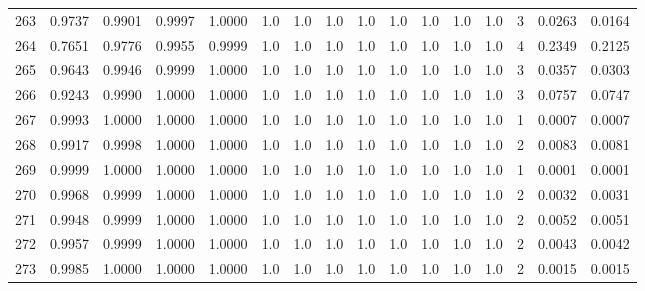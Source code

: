 \begin{tabular}{lrrrrrrrrrrrrrrr}
263 &      0.9737 &  0.9901 &  0.9997 &  1.0000 &     1.0 &     1.0 &     1.0 &     1.0 &     1.0 &     1.0 &      1.0 &        1.0 &      3 &                    0.0263 &                     0.0164 \\
264 &      0.7651 &  0.9776 &  0.9955 &  0.9999 &     1.0 &     1.0 &     1.0 &     1.0 &     1.0 &     1.0 &      1.0 &        1.0 &      4 &                    0.2349 &                     0.2125 \\
265 &      0.9643 &  0.9946 &  0.9999 &  1.0000 &     1.0 &     1.0 &     1.0 &     1.0 &     1.0 &     1.0 &      1.0 &        1.0 &      3 &                    0.0357 &                     0.0303 \\
266 &      0.9243 &  0.9990 &  1.0000 &  1.0000 &     1.0 &     1.0 &     1.0 &     1.0 &     1.0 &     1.0 &      1.0 &        1.0 &      3 &                    0.0757 &                     0.0747 \\
267 &      0.9993 &  1.0000 &  1.0000 &  1.0000 &     1.0 &     1.0 &     1.0 &     1.0 &     1.0 &     1.0 &      1.0 &        1.0 &      1 &                    0.0007 &                     0.0007 \\
268 &      0.9917 &  0.9998 &  1.0000 &  1.0000 &     1.0 &     1.0 &     1.0 &     1.0 &     1.0 &     1.0 &      1.0 &        1.0 &      2 &                    0.0083 &                     0.0081 \\
269 &      0.9999 &  1.0000 &  1.0000 &  1.0000 &     1.0 &     1.0 &     1.0 &     1.0 &     1.0 &     1.0 &      1.0 &        1.0 &      1 &                    0.0001 &                     0.0001 \\
270 &      0.9968 &  0.9999 &  1.0000 &  1.0000 &     1.0 &     1.0 &     1.0 &     1.0 &     1.0 &     1.0 &      1.0 &        1.0 &      2 &                    0.0032 &                     0.0031 \\
271 &      0.9948 &  0.9999 &  1.0000 &  1.0000 &     1.0 &     1.0 &     1.0 &     1.0 &     1.0 &     1.0 &      1.0 &        1.0 &      2 &                    0.0052 &                     0.0051 \\
272 &      0.9957 &  0.9999 &  1.0000 &  1.0000 &     1.0 &     1.0 &     1.0 &     1.0 &     1.0 &     1.0 &      1.0 &        1.0 &      2 &                    0.0043 &                     0.0042 \\
273 &      0.9985 &  1.0000 &  1.0000 &  1.0000 &     1.0 &     1.0 &     1.0 &     1.0 &     1.0 &     1.0 &      1.0 &        1.0 &      2 &                    0.0015 &                     0.0015 \\

\end{tabular}
